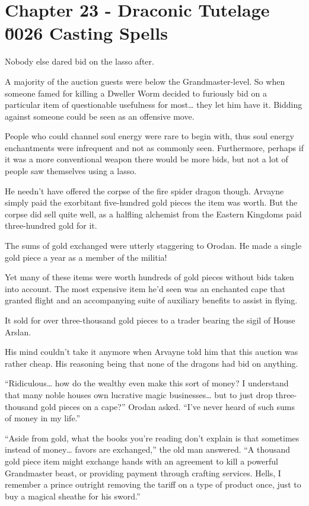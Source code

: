 \documentclass[a4paper,10pt]{book}
\begin{document}
\section*{Chapter 23 - Draconic Tutelage \u0026 Casting Spells}
%
\par
Nobody else dared bid on the lasso after.\par
A majority of the auction guests were below the Grandmaster-level. So when someone famed for killing a Dweller Worm decided to furiously bid on a particular item of questionable usefulness for most… they let him have it. Bidding against someone could be seen as an offensive move.\par
People who could channel soul energy were rare to begin with, thus soul energy enchantments were infrequent and not as commonly seen. Furthermore, perhaps if it was a more conventional weapon there would be more bids, but not a lot of people saw themselves using a lasso.\par
He needn’t have offered the corpse of the fire spider dragon though. Arvayne simply paid the exorbitant five-hundred gold pieces the item was worth. But the corpse did sell quite well, as a halfling alchemist from the Eastern Kingdoms paid three-hundred gold for it.\par
The sums of gold exchanged were utterly staggering to Orodan. He made a single gold piece a year as a member of the militia!\par
Yet many of these items were worth hundreds of gold pieces without bids taken into account. The most expensive item he’d seen was an enchanted cape that granted flight and an accompanying suite of auxiliary benefits to assist in flying.\par
It sold for over three-thousand gold pieces to a trader bearing the sigil of House Arslan.\par
His mind couldn’t take it anymore when Arvayne told him that this auction was rather cheap. His reasoning being that none of the dragons had bid on anything.\par
“Ridiculous… how do the wealthy even make this sort of money? I understand that many noble houses own lucrative magic businesses… but to just drop three-thousand gold pieces on a cape?” Orodan asked. “I’ve never heard of such sums of money in my life.”\par
“Aside from gold, what the books you’re reading don’t explain is that sometimes instead of money… favors are exchanged,” the old man answered. “A thousand gold piece item might exchange hands with an agreement to kill a powerful Grandmaster beast, or providing payment through crafting services. Hells, I remember a prince outright removing the tariff on a type of product once, just to buy a magical sheathe for his sword.”\par
\end{document}
